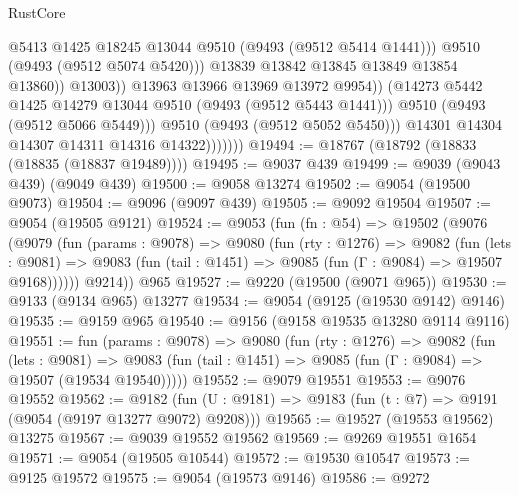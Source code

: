 \begin{lexlean}{RustCore}
\begin{coremodule}
                                      @5413
                                      @1425
                                      @18245
                                      @13044
                                      @9510
                                      (@9493 (@9512 @5414 @1441)))
                                    @9510
                                    (@9493 (@9512 @5074 @5420)))
                                  @13839
                                  @13842
                                  @13845
                                  @13849
                                  @13854
                                  @13860))
                              @13003))
                          @13963
                          @13966
                          @13969
                          @13972
                          @9954))
                      (@14273 @5442 @1425 @14279 @13044 @9510 (@9493 (@9512 @5443 @1441)))
                      @9510
                      (@9493 (@9512 @5066 @5449)))
                    @9510
                    (@9493 (@9512 @5052 @5450)))
                  @14301
                  @14304
                  @14307
                  @14311
                  @14316
                  @14322)))))))
@19494 := @18767 (@18792 (@18833 (@18835 (@18837 @19489))))
@19495 := @9037 @439
@19499 := @9039 (@9043 @439) (@9049 @439)
@19500 := @9058 @13274
@19502 := @9054 (@19500 @9073)
@19504 := @9096 (@9097 @439)
@19505 := @9092 @19504
@19507 := @9054 (@19505 @9121)
@19524 := @9053
    (fun (fn : @54) =>
    @19502
      (@9076
        (@9079
          (fun (params : @9078) =>
          @9080
            (fun (rty : @1276) =>
            @9082
              (fun (lets : @9081) =>
              @9083 (fun (tail : @1451) => @9085 (fun (Γ : @9084) => @19507 @9168))))))
        @9214))
    @965
@19527 := @9220 (@19500 (@9071 @965))
@19530 := @9133 (@9134 @965) @13277
@19534 := @9054 (@9125 (@19530 @9142) @9146)
@19535 := @9159 @965
@19540 := @9156 (@9158 @19535 @13280 @9114 @9116)
@19551 := fun (params : @9078) =>
  @9080
    (fun (rty : @1276) =>
    @9082
      (fun (lets : @9081) =>
      @9083 (fun (tail : @1451) => @9085 (fun (Γ : @9084) => @19507 (@19534 @19540)))))
@19552 := @9079 @19551
@19553 := @9076 @19552
@19562 := @9182
    (fun (U : @9181) => @9183 (fun (t : @7) => @9191 (@9054 (@9197 @13277 @9072) @9208)))
@19565 := @19527 (@19553 @19562) @13275
@19567 := @9039 @19552 @19562
@19569 := @9269 @19551 @1654
@19571 := @9054 (@19505 @10544)
@19572 := @19530 @10547
@19573 := @9125 @19572
@19575 := @9054 (@19573 @9146)
@19586 := @9272

\end{coremodule}
\end{lexlean}
